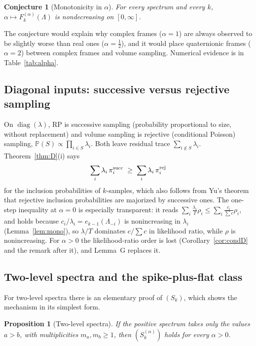 \documentclass[11pt,a4paper]{article}
\newtheorem{proposition}[theorem]{Proposition}
\newtheorem{conjecture}[theorem]{Conjecture}
\theoremstyle{definition}
\newcommand{\PP}{\mathbb{P}}
\newcommand{\diag}{\operatorname{diag}}
\begin{document}
\begin{conjecture}[Monotonicity in $\alpha$]\label{conj:alpha}
For every spectrum and every $k$, $\alpha\mapsto F_k^{(\alpha)}(\Lambda)$ is nondecreasing on $[0,\infty]$.
\end{conjecture}

The conjecture would explain why complex frames ($\alpha=1$) are always observed to be slightly worse than real ones ($\alpha=\frac12$), and it would place quaternionic frames ($\alpha=2$) between complex frames and volume sampling. Numerical evidence is in Table~\ref{tab:alpha}.

\subsection{Diagonal inputs: successive versus rejective sampling}
On $\diag(\lambda)$, RP is successive sampling (probability proportional to size, without replacement) and volume sampling is rejective (conditional Poisson) sampling, $\PP(S)\propto\prod_{i\in S}\lambda_i$. Both leave residual trace $\sum_{i\notin S}\lambda_i$. Theorem~\ref{thm:D}(i) says
\[
\sum_i\lambda_i\,\pi^{\rm succ}_i\;\ge\;\sum_i\lambda_i\,\pi^{\rm rej}_i
\]
for the inclusion probabilities of $k$-samples, which also follows from Yu's theorem \cite[Thm.~1]{Yu} that rejective inclusion probabilities are majorized by successive ones. The one-step inequality at $\alpha=0$ is especially transparent: it reads $\sum_i\frac{\lambda_i}{T}\rho_i\le\sum_i\frac{c_i}{\sum c}\rho_i$, and holds because $c_i/\lambda_i=e_{k-1}(\Lambda_{-i})$ is nonincreasing in $\lambda_i$ (Lemma~\ref{lem:mono}), so $\lambda/T$ dominates $c/\sum c$ in likelihood ratio, while $\rho$ is nonincreasing. For $\alpha>0$ the likelihood-ratio order is lost (Corollary~\ref{cor:condD} and the remark after it), and Lemma~G replaces it.

\subsection{Two-level spectra and the spike-plus-flat class}
For two-level spectra there is an elementary proof of $(S_k)$, which shows the mechanism in its simplest form.

\begin{proposition}[Two-level spectra]\label{prop:twolevel}
If the positive spectrum takes only the values $a>b$, with multiplicities $m_a,m_b\ge1$, then $(S^{(\alpha)}_k)$ holds for every $\alpha>0$.
\end{proposition}
\end{document}
